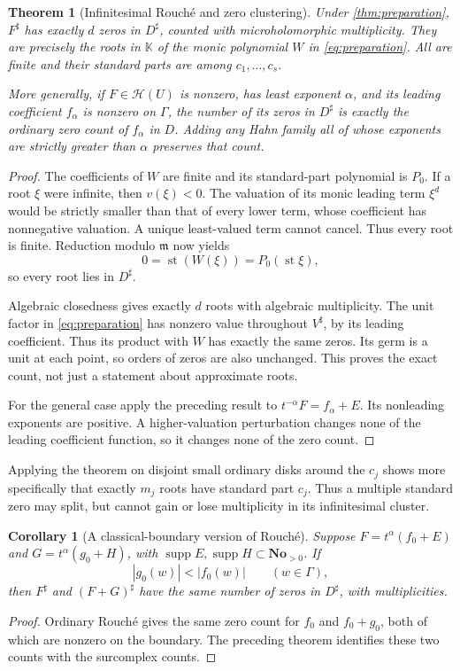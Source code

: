 \documentclass[11pt,letterpaper]{article}
\numberwithin{equation}{section}
\newtheorem{theorem}{Theorem}[section]
\newtheorem{corollary}[corollary]{Corollary}
\theoremstyle{definition}
\theoremstyle{remark}
\newcommand{\No}{\mathbf{No}}
\newcommand{\K}{\mathbb K}
\newcommand{\HH}{\mathscr H}
\newcommand{\mm}{\mathfrak m}
\DeclareMathOperator{\supp}{supp}
\DeclareMathOperator{\st}{st}
\begin{document}
\begin{theorem}[Infinitesimal Rouch\'e and zero clustering]\label{thm:rouche}
Under \cref{thm:preparation}, $F^\sharp$ has exactly $d$ zeros in
$D^\sharp$, counted with microholomorphic multiplicity. They are precisely
the roots in $\K$ of the monic polynomial $W$ in
\eqref{eq:preparation}. All are finite and their standard parts are among
$c_1,\ldots,c_s$.

More generally, if $F\in\HH(U)$ is nonzero, has least exponent $\alpha$,
and its leading coefficient $f_\alpha$ is nonzero on $\Gamma$, the
number of its zeros in $D^\sharp$ is exactly the ordinary zero count of
$f_\alpha$ in $D$. Adding any Hahn family all of whose exponents are
strictly greater than $\alpha$ preserves that count.
\end{theorem}
\begin{proof}
The coefficients of $W$ are finite and its standard-part polynomial is
$P_0$. If a root $\xi$ were infinite, then $v(\xi)<0$. The valuation
of its monic leading term $\xi^d$ would be strictly smaller than that
of every lower term, whose coefficient has nonnegative valuation.
A unique least-valued term cannot cancel. Thus every root is finite.
Reduction modulo $\mm$ now yields
\[
 0=\st(W(\xi))=P_0(\st\xi),
\]
so every root lies in $D^\sharp$.

Algebraic closedness gives exactly $d$ roots with algebraic multiplicity.
The unit factor in \eqref{eq:preparation} has nonzero value throughout
$V^\sharp$, by its leading coefficient. Thus its product with $W$ has
exactly the same zeros. Its germ is a unit at each point, so orders of
zeros are also unchanged. This proves the exact count, not just a
statement about approximate roots.

For the general case apply the preceding result to
$t^{-\alpha}F=f_\alpha+E$. Its nonleading exponents are positive.
A higher-valuation perturbation changes none of the leading coefficient
function, so it changes none of the zero count.
\end{proof}

Applying the theorem on disjoint small ordinary disks around the $c_j$
shows more specifically that exactly $m_j$ roots have standard part
$c_j$. Thus a multiple standard zero may split, but cannot gain or lose
multiplicity in its infinitesimal cluster.

\begin{corollary}[A classical-boundary version of Rouch\'e]
Suppose $F=t^\alpha(f_0+E)$ and $G=t^\alpha(g_0+H)$, with
$\supp E,\supp H\subset\No_{>0}$. If
\[
 |g_0(w)|<|f_0(w)|\qquad(w\in\Gamma),
\]
then $F^\sharp$ and $(F+G)^\sharp$ have the same number of zeros in
$D^\sharp$, with multiplicities.
\end{corollary}
\begin{proof}
Ordinary Rouch\'e gives the same zero count for $f_0$ and $f_0+g_0$,
both of which are nonzero on the boundary. The preceding theorem
identifies these two counts with the surcomplex counts.
\end{proof}
\end{document}
